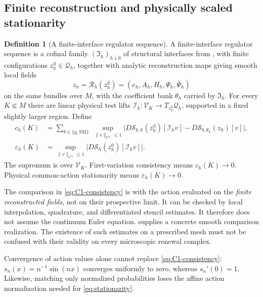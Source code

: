 \documentclass[11pt]{article}
\numberwithin{equation}{section}
\theoremstyle{definition}
\newtheorem{definition}[definition]{Definition}
\theoremstyle{remark}
\newcommand{\norm}[1]{\lVert#1\rVert}
\newcommand{\abs}[1]{\lvert#1\rvert}
\newcommand{\Sact}{\mathscr S}
\newcommand{\Vtest}{\mathscr V}
\newcommand{\bPsi}{\overline\Psi}
\newcommand{\Iface}{\mathfrak I}
\begin{document}
\subsection{Finite reconstruction and physically scaled stationarity}

\begin{definition}[A finite-interface regulator sequence]
\label{def:regulator}
A finite-interface regulator sequence is a cofinal family $(\Iface_h)_{h\downarrow0}$ of structural interfaces from , with finite configurations $z_h^{\mathrm d}\in\mathcal Q_h$, together with analytic reconstruction maps giving smooth local fields
\[
 z_h=\mathcal R_h(z_h^{\mathrm d})=(e_h,A_h,H_h,\Psi_h,\bPsi_h)
\]
on the same bundles over $M$, with the coefficient bank $\theta_h$ carried by $\Iface_h$. For every $K\Subset M$ there are linear physical test lifts $\mathcal I_h:\Vtest_K\to T_{z_h^{\mathrm d}}\mathcal Q_h$, supported in a fixed slightly larger region. Define
\begin{align}
 c_h(K)&=\sum_{b\in\{\mathrm g,\mathrm{SM}\}}\;\sup_{\norm v_{C^{r_0}}\le1}
 \abs{D\Sact_{b,h}(z_h^{\mathrm d})[\mathcal I_hv]
       -D\Sact_{b,\theta_h}(z_h)[v]},
 \label{eq:C1-consistency}\\
 \varepsilon_h(K)&=\sup_{\norm v_{C^{r_0}}\le1}
 \abs{D\Sact_h(z_h^{\mathrm d})[\mathcal I_hv]}.
 \label{eq:stationarity}
\end{align}
The supremum is over $\Vtest_K$. First-variation consistency means $c_h(K)\to0$. Physical common-action stationarity means $\varepsilon_h(K)\to0$.
\end{definition}

The comparison in \eqref{eq:C1-consistency} is with the action evaluated on the \emph{finite reconstructed fields}, not on their prospective limit. It can be checked by local interpolation, quadrature, and differentiated stencil estimates. It therefore does not assume the continuum Euler equation.  supplies a concrete smooth comparison realization. The existence of such estimates on a prescribed mesh must not be confused with their validity on every microscopic renewal complex.

Convergence of action values alone cannot replace \eqref{eq:C1-consistency}: $s_n(x)=n^{-1}\sin(nx)$ converges uniformly to zero, whereas $s_n'(0)=1$. Likewise, matching only normalized probabilities loses the affine action normalization needed for \eqref{eq:stationarity}.
\end{document}
